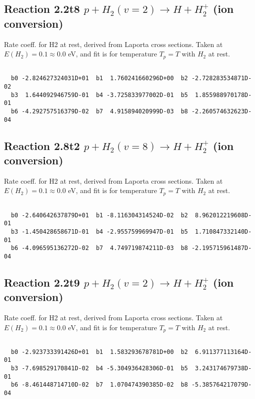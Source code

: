 \documentclass[12pt,dvipdfmx]{article}
\begin{document}
\newpage
\subsection{
Reaction 2.2t8
$ p + H_2(v=2) \rightarrow H + H_2^+$ (ion conversion)
}
Rate coeff. for H2 at rest, derived from Laporta cross sections.
Taken at $E(H_2) = 0.1 \approx 0.0$ eV,  and fit is for temperature $T_p=T$ with $H_2$ at rest.

\begin{small}\begin{verbatim}

  b0 -2.824627324031D+01  b1  1.760241660296D+00  b2 -2.728283534871D-02
  b3  1.644092946759D-01  b4 -3.725833977002D-01  b5  1.855988970178D-01
  b6 -4.292757516379D-02  b7  4.915894020999D-03  b8 -2.260574632623D-04

\end{verbatim}\end{small}

\newpage
\subsection{
Reaction 2.8t2
$ p + H_2(v=8) \rightarrow H + H_2^+$ (ion conversion)
}
Rate coeff. for H2 at rest, derived from Laporta cross sections.
Taken at $E(H_2) = 0.1 \approx 0.0$ eV,  and fit is for temperature $T_p=T$ with $H_2$ at rest.

\begin{small}\begin{verbatim}

  b0 -2.640642637879D+01  b1 -8.116304314524D-02  b2  8.962012219608D-01
  b3 -1.450428658671D-01  b4 -2.955759969947D-01  b5  1.710847332140D-01
  b6 -4.096595136272D-02  b7  4.749719874211D-03  b8 -2.195715961487D-04

\end{verbatim}\end{small}

\newpage
\subsection{
Reaction 2.2t9
$ p + H_2(v=2) \rightarrow H + H_2^+$ (ion conversion)
}
Rate coeff. for H2 at rest, derived from Laporta cross sections.
Taken at $E(H_2) = 0.1 \approx 0.0$ eV,  and fit is for temperature $T_p=T$ with $H_2$ at rest.

\begin{small}\begin{verbatim}

  b0 -2.923733391426D+01  b1  1.583293678781D+00  b2  6.911377113164D-01
  b3 -7.698529170841D-02  b4 -5.304936428306D-01  b5  3.243174679738D-01
  b6 -8.461448714710D-02  b7  1.070474390385D-02  b8 -5.385764217079D-04

\end{verbatim}\end{small}
\end{document}
